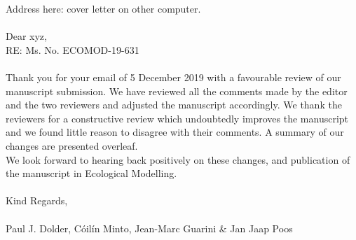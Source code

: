 \documentclass{article}
\begin{document}
\large

Address here: cover letter on other computer. \\
\\
Dear xyz, \\
RE: Ms. No. ECOMOD-19-631 \\
\\
Thank you for your email of 5 December 2019 with a favourable review of our
manuscript submission. We have reviewed all the comments made by the editor and
the two reviewers and adjusted the manuscript accordingly. We thank the
reviewers for a constructive review which undoubtedly improves the manuscript
and we found little reason to disagree with their comments. A summary of our
changes are presented overleaf. \\

We look forward to hearing back positively on these changes, and publication of
the manuscript in Ecological Modelling. \\
\\
Kind Regards,\\
\\
Paul J. Dolder, Cóilín Minto, Jean-Marc Guarini \& Jan Jaap Poos

\newpage
\end{document}
